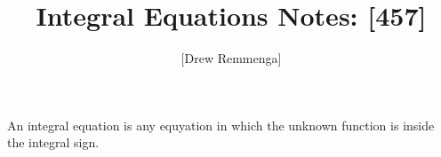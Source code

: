 \documentclass[10pt, oneside]{article}
\title{Integral Equations Notes: [457]}
\author{[Drew Remmenga]}
\begin{document}
\maketitle

\vspace{.25in}

\begin{definition}
    An integral equation is any equyation in which the unknown function is inside the integral sign.
    
\end{definition}
\end{document}
